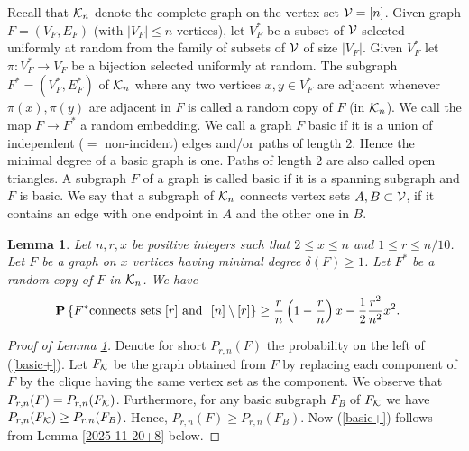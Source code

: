 \documentclass[11pt, a4paper]{article}
\newcommand{\PP}{{\bf{P}}}
\newtheorem{lem}{Lemma}
\begin{document}
 Recall that  ${\cal K}_n$ denote the complete graph on the 
 vertex 
set ${\cal V}=[n]$. 
 Given  graph $F=(V_F,E_F)$ (with $|V_F|\le n$ vertices), let $V^*_F$ be a subset of ${\cal V}$ selected uniformly at random from the family of 
 subsets of ${\cal V}$ of 
 size $|V_F|$.
 Given $V^*_F$ let $\pi:V^*_F\to V_F$ be a bijection selected uniformly at random.
 The subgraph $F^*=(V^*_F,E^*_F)$ of ${\cal K}_n$ where any 
 two vertices $x,y\in V^*_F$ are adjacent whenever  
$\pi(x), \pi(y)$ are adjacent in $F$ is called a random 
copy of $F$ (in ${\cal K}_n$).
We call the map $F\to F^*$ a random embedding.
We call a graph  $F$ basic if it is a union of independent 
($=$ non-incident) edges and/or paths of length $2$. Hence 
the minimal degree of a basic graph is one.
Paths of length $2$ are also called open triangles. A subgraph $F$ of a graph is called basic if it is a spanning subgraph and $F$ is basic.  We say that a subgraph of 
 ${\cal K}_n$ connects vertex sets $A, B\subset {\cal V}$,
 if it contains an edge with one endpoint in $A$ and the other one in $B$.
 
 
 
\begin{lem}\label{basic} Let $n, r, x$ be positive integers such that $2\le x\le n$  and $1\le r\le n/10$. 
Let $F$ be a graph on $x$ vertices having minimal degree
$\delta(F)\ge 1$. Let $F^*$ be a random copy of $F$ in 
${\cal K}_n$. We have
\begin{align}
\label{basic+}
\PP\left\{
F^* {\text{connects   sets\ }} [r] {\text{\ and \ }} [n]\setminus[r]
\right\}
&
\ge 
\frac{r}{n}
\left(
1-\frac{r}{n}
\right)
x
-
\frac{1}{2}\frac{r^2}{n^2}
x^2.
\end{align}
\end{lem} 
 

\begin{proof}[Proof of Lemma \ref{basic}]
Denote for short $P_{r,n}(F)$ the probability on the left of (\ref{basic+}). Let $F_{\cal K}$ be the graph obtained from $F$ by replacing each component of $F$ by the clique having the same vertex set as the component. We observe  that
 $P_{r,n}(F)=P_{r,n}(F_{\cal K})$. Furthermore, for any 
basic subgraph   $F_B$  of $F_{\cal K}$ we have 
$P_{r,n}(F_{\cal K})\ge P_{r,n}(F_B)$.
Hence, $P_{r,n}(F)\ge P_{r,n}(F_B)$. Now (\ref{basic+}) follows from Lemma \ref{2025-11-20+8} below.
\end{proof} 
  
\end{document}
